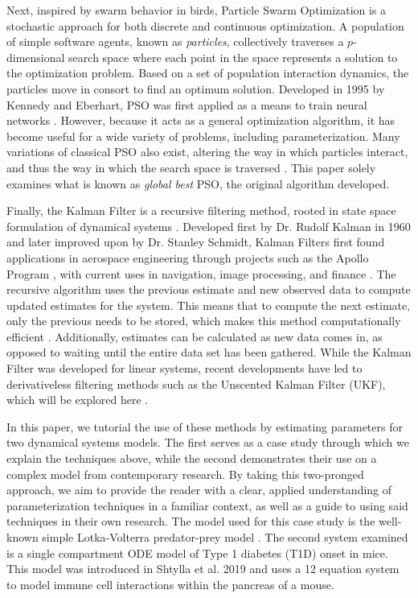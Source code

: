 \par Next, inspired by swarm behavior in birds, Particle Swarm Optimization is a stochastic approach for both discrete and continuous optimization. A population of simple software agents, known as \emph{particles}, collectively traverses a $p$-dimensional search space where each point in the space represents a solution to the optimization problem. Based on a set of population interaction dynamics, the particles move in consort to find an optimum solution. Developed in 1995 by Kennedy and Eberhart, PSO was first applied as a means to train neural networks \cite{PSOorig}. However, because it acts as a general optimization algorithm, it has become useful for a wide variety of problems, including parameterization. Many variations of classical PSO also exist, altering the way in which particles interact, and thus the way in which the search space is traversed \cite{PSOthesis}. This paper solely examines what is known as \emph{global best} PSO, the original algorithm developed. 
\par Finally, the Kalman Filter is a recursive filtering method, rooted in state space formulation of dynamical systems \cite{SimonHaykinText}. Developed first by Dr. Rudolf Kalman in 1960 and later improved upon by Dr. Stanley Schmidt, Kalman Filters first found applications in aerospace engineering through projects such as the Apollo Program \cite{NASAPaper}, with current uses in navigation, image processing, and finance \cite{TamThesis}. The recursive algorithm uses the previous estimate and new observed data to compute updated estimates for the system. This means that to compute the next estimate, only the previous needs to be stored, which makes this method computationally efficient \cite{SimonHaykinText}. Additionally, estimates can be calculated as new data comes in, as opposed to waiting until the entire data set has been gathered. While the Kalman Filter was developed for linear systems, recent developments have led to derivativeless filtering methods such as the Unscented Kalman Filter (UKF), which will be explored here \cite{GoveHollingerDual}.
\par In this paper, we tutorial the use of these methods by estimating parameters for two dynamical systems models. The first serves as a case study through which we explain the techniques above, while the second demonstrates their use on a complex model from contemporary research. By taking this two-pronged approach, we aim to provide the reader with a clear, applied understanding of parameterization techniques in a familiar context, as well as a guide to using said techniques in their own research. The model used for this case study is the well-known simple Lotka-Volterra predator-prey model \cite{Lotka} \cite{Volterra}. The second system examined is a single compartment ODE model of Type 1 diabetes (T1D) onset in mice. This model was introduced in Shtylla et al. 2019 \cite{shtylla2019mathematical} and uses a 12 equation system to model immune cell interactions within the pancreas of a mouse.
